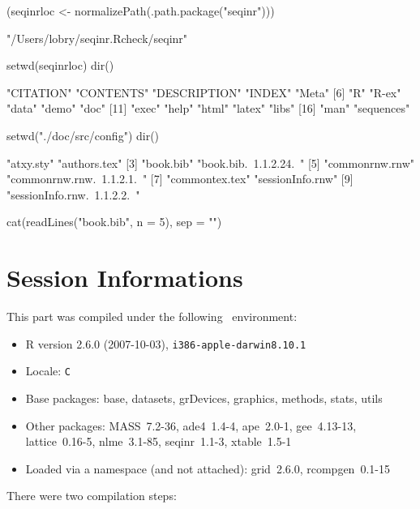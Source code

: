 \documentclass{article}
\begin{document}
\begin{Schunk}
\begin{Sinput}
 (seqinrloc <- normalizePath(.path.package("seqinr")))
\end{Sinput}
\begin{Soutput}
[1] "/Users/lobry/seqinr.Rcheck/seqinr"
\end{Soutput}
\begin{Sinput}
 setwd(seqinrloc)
 dir()
\end{Sinput}
\begin{Soutput}
 [1] "CITATION"    "CONTENTS"    "DESCRIPTION" "INDEX"       "Meta"       
 [6] "R"           "R-ex"        "data"        "demo"        "doc"        
[11] "exec"        "help"        "html"        "latex"       "libs"       
[16] "man"         "sequences"  
\end{Soutput}
\begin{Sinput}
 setwd("./doc/src/config")
 dir()
\end{Sinput}
\begin{Soutput}
[1] "atxy.sty"                   "authors.tex"               
[3] "book.bib"                   "book.bib.~1.1.2.24.~"      
[5] "commonrnw.rnw"              "commonrnw.rnw.~1.1.2.1.~"  
[7] "commontex.tex"              "sessionInfo.rnw"           
[9] "sessionInfo.rnw.~1.1.2.2.~"
\end{Soutput}
\begin{Sinput}
 cat(readLines("book.bib", n = 5), sep = "\n")
\end{Sinput}
\begin{Soutput}
@incollection{seqinr,
    author = {Charif, D. and Lobry, J.R.},
    title = {Seqin{R} 1.0-2: a contributed package to the {R} project for statistical computing devoted to biological sequences retrieval and analysis.},
    booktitle = {Structural approaches to sequence evolution: Molecules, networks, populations},
    year = {2007},
\end{Soutput}
\end{Schunk}

%
%


\section*{Session Informations}

This part was compiled under the following \Rlogo{}~environment:

\begin{itemize}
  \item R version 2.6.0 (2007-10-03), \verb|i386-apple-darwin8.10.1|
  \item Locale: \verb|C|
  \item Base packages: base, datasets, grDevices, graphics, methods,
    stats, utils
  \item Other packages: MASS~7.2-36, ade4~1.4-4, ape~2.0-1,
    gee~4.13-13, lattice~0.16-5, nlme~3.1-85, seqinr~1.1-3,
    xtable~1.5-1
  \item Loaded via a namespace (and not attached): grid~2.6.0,
    rcompgen~0.1-15
\end{itemize}
There were two compilation steps:
\end{document}
